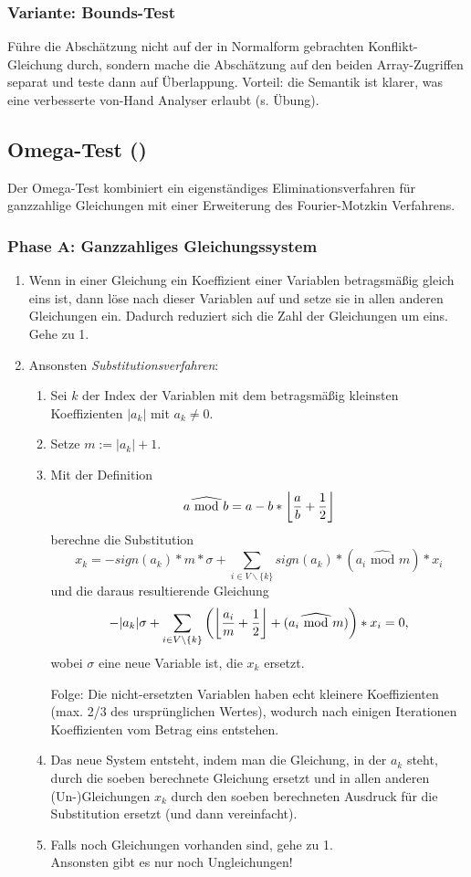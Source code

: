 \subsubsection{Variante: Bounds-Test}
Führe die Abschätzung nicht auf der in Normalform gebrachten
Konflikt-Gleichung durch, sondern mache die Abschätzung auf den beiden
Array-Zugriffen separat und teste dann auf Überlappung. Vorteil: die
Semantik ist klarer, was eine verbesserte von-Hand Analyser erlaubt
(s. Übung).


\subsection{Omega-Test (\cite{Pugh95a})}
\def\MOD{\widehat{\textrm{\ mod\ }}}
Der Omega-Test kombiniert ein eigenständiges Eliminationsverfahren für
ganzzahlige Gleichungen mit einer Erweiterung des Fourier-Motzkin
Verfahrens.

\subsubsection{Phase A: Ganzzahliges Gleichungssystem}
\begin{enumerate}
\item Wenn in einer Gleichung ein Koeffizient einer Variablen
  betragsmäßig gleich eins ist, dann löse nach dieser Variablen auf
  und setze sie in allen anderen Gleichungen ein. Dadurch reduziert
  sich die Zahl der Gleichungen um eins. Gehe zu 1.
\item Ansonsten \emph{Substitutionsverfahren}:
  \begin{enumerate}
  \item Sei $k$ der Index der Variablen mit dem betragsmäßig kleinsten
    Koeffizienten $|a_k|$ mit $a_k\not=0$.
  \item Setze $m:= |a_k|+1$.
  \item Mit der Definition $$a\MOD b = a - b *
    \left\lfloor {a\over b} + {1 \over 2}\right \rfloor$$
    berechne die Substitution $$x_k = -sign(a_k)*m*\sigma +
    \sum_{i\in V\backslash\{k\}} sign(a_k)*(a_i \MOD m) * x_i$$
    und die daraus resultierende Gleichung
    $$-|a_k|\sigma + \sum_{i\in V\backslash\{k\}}\left(\left\lfloor{a_i\over
        m} + {1\over 2}\right\rfloor + (a_i\MOD m)\right) * x_i = 0,$$
    wobei $\sigma$ eine neue Variable ist, die $x_k$ ersetzt.

    Folge: Die nicht-ersetzten Variablen haben echt kleinere
    Koeffizienten (max. 2/3 des ursprünglichen Wertes), wodurch nach
    einigen Iterationen Koeffizienten vom Betrag eins entstehen.
  \item Das neue System entsteht, indem man die Gleichung, in der $a_k$
    steht, durch die soeben berechnete Gleichung ersetzt und in allen
    anderen (Un-)Gleichungen $x_k$ durch den soeben berechneten Ausdruck
    für die Substitution ersetzt (und dann vereinfacht).
  \item Falls noch Gleichungen vorhanden sind, gehe zu 1. \\
    Ansonsten gibt es nur noch Ungleichungen!
  \end{enumerate}
\setcounter{enumTemp}{\theenumi}
\end{enumerate}

